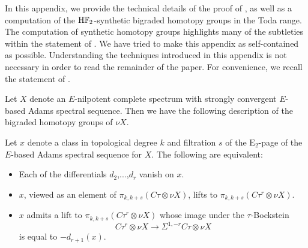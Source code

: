 In this appendix, we provide the technical details of the proof of , as well as a computation of the $\mathrm{H}\mathbb{F}_2$-synthetic bigraded homotopy groups in the Toda range. The computation of synthetic homotopy groups highlights many of the subtleties within the statement of . We have tried to make this appendix as self-contained as possible. %
Understanding the techniques introduced in this appendix is not necessary in order to read the remainder of the paper. For convenience, we recall the statement of .

\begin{thm}
  Let $X$ denote an $E$-nilpotent complete spectrum with strongly convergent $E$-based Adams spectral sequence.
  Then we have the following description of the bigraded homotopy groups of $\nu X$.

  Let $x$ denote a class in topological degree $k$ and filtration $s$ of the $\mathrm{E}_2$-page of the $E$-based Adams spectral sequence for $X$. The following are equivalent:
  \begin{itemize}
  \item[(1a)] Each of the differentials $d_2$,...,$d_r$ vanish on $x$.
  \item[(1b)] $x$, viewed as an element of $\pi_{k,k+s}(C\tau \otimes \nu X)$, lifts to $\pi_{k,k+s}(C\tau^r \otimes \nu X)$.
  \item[(1c)] $x$ admits a lift to $\pi_{k,k+s}(C\tau^r \otimes \nu X)$ whose image under the $\tau$-Bockstein
  $$ C\tau^r \otimes \nu X \to \Sigma^{1,-r} C\tau \otimes \nu X $$
  is equal to $-d_{r+1}(x)$.
  \end{itemize}


\end{thm}
